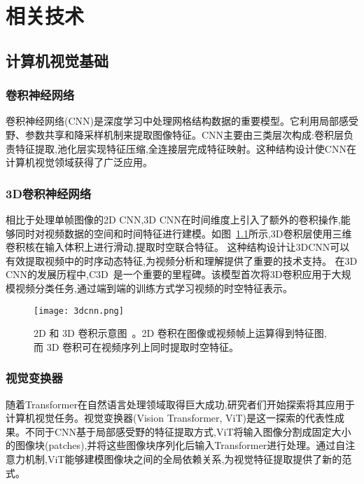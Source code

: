 

\chapter{相关技术}
\label{chap:background}

\section{计算机视觉基础} %

\subsection{卷积神经网络}
卷积神经网络(CNN)是深度学习中处理网格结构数据的重要模型。它利用局部感受野、参数共享和降采样机制来提取图像特征。CNN主要由三类层次构成:卷积层负责特征提取,池化层实现特征压缩,全连接层完成特征映射。这种结构设计使CNN在计算机视觉领域获得了广泛应用。

\subsection{3D卷积神经网络}
相比于处理单帧图像的2D CNN,3D CNN在时间维度上引入了额外的卷积操作,能够同时对视频数据的空间和时间特征进行建模。如图~\ref{fig:3dcnn}所示,3D卷积层使用三维卷积核在输入体积上进行滑动,提取时空联合特征。
这种结构设计让3DCNN可以有效提取视频中的时序动态特征,为视频分析和理解提供了重要的技术支持。
在3D CNN的发展历程中,C3D~\cite{tran2015c3d}是一个重要的里程碑。该模型首次将3D卷积应用于大规模视频分类任务,通过端到端的训练方式学习视频的时空特征表示。
\begin{figure}[htbp]
    \centering
    \texttt{[image: 3dcnn.png]}
    \caption{2D 和 3D 卷积示意图~\cite{tran2015c3d}。2D 卷积在图像或视频帧上运算得到特征图,而 3D 卷积可在视频序列上同时提取时空特征。}
    \label{fig:3dcnn}
\end{figure}

\subsection{视觉变换器}
随着Transformer在自然语言处理领域取得巨大成功,研究者们开始探索将其应用于计算机视觉任务。视觉变换器(Vision Transformer, ViT)是这一探索的代表性成果。不同于CNN基于局部感受野的特征提取方式,ViT将输入图像分割成固定大小的图像块(patches),并将这些图像块序列化后输入Transformer进行处理。通过自注意力机制,ViT能够建模图像块之间的全局依赖关系,为视觉特征提取提供了新的范式。


